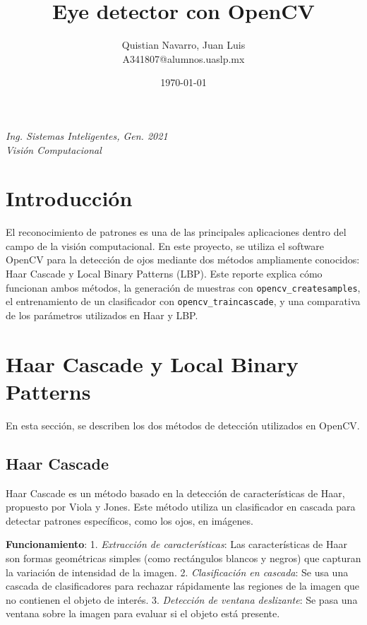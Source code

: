 \documentclass{article}
\title{Eye detector con OpenCV}
\author{
  \begin{minipage}[t]{0.4\linewidth}
    \centering
    Quistian Navarro, Juan Luis\\
    A341807@alumnos.uaslp.mx 
  \end{minipage}
}
\date{\today}
\begin{document}
\maketitle

\begin{minipage}{\textwidth}
    \centering
    \textit{Ing. Sistemas Inteligentes, Gen. 2021} \\
    \textit{Visión Computacional}
\end{minipage}

\newpage

\section{Introducción}
El reconocimiento de patrones es una de las principales aplicaciones dentro del campo de la visión computacional. En este proyecto, se utiliza el software OpenCV para la detección de ojos mediante dos métodos ampliamente conocidos: Haar Cascade y Local Binary Patterns (LBP). Este reporte explica cómo funcionan ambos métodos, la generación de muestras con \texttt{opencv\_createsamples}, el entrenamiento de un clasificador con \texttt{opencv\_traincascade}, y una comparativa de los parámetros utilizados en Haar y LBP.

\section{Haar Cascade y Local Binary Patterns}
En esta sección, se describen los dos métodos de detección utilizados en OpenCV.

\subsection{Haar Cascade}
Haar Cascade es un método basado en la detección de características de Haar, propuesto por Viola y Jones. Este método utiliza un clasificador en cascada para detectar patrones específicos, como los ojos, en imágenes.

\textbf{Funcionamiento}:
1. \textit{Extracción de características}: Las características de Haar son formas geométricas simples (como rectángulos blancos y negros) que capturan la variación de intensidad de la imagen.
2. \textit{Clasificación en cascada}: Se usa una cascada de clasificadores para rechazar rápidamente las regiones de la imagen que no contienen el objeto de interés.
3. \textit{Detección de ventana deslizante}: Se pasa una ventana sobre la imagen para evaluar si el objeto está presente.
\end{document}
